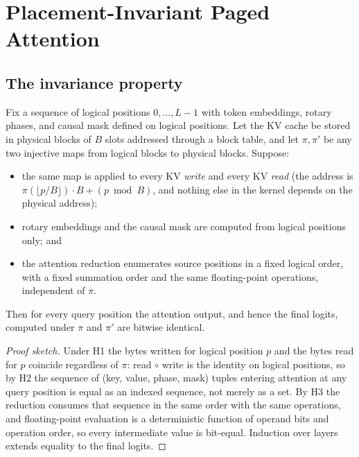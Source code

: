 \documentclass[sigconf,nonacm,screen]{acmart}
\begin{document}
\section{Placement-Invariant Paged Attention}
\label{sec:vpa}

\subsection{The invariance property}
\label{sec:vpa-prop}

\begin{proposition}
\label{prop:invariance}
Fix a sequence of logical positions $0,\dots,L-1$ with token embeddings,
rotary phases, and causal mask defined on logical positions. Let the KV cache
be stored in physical blocks of $B$ slots addressed through a block table,
and let $\pi,\pi'$ be any two injective maps from logical blocks to physical
blocks. Suppose:
\begin{itemize}\itemsep1pt
  \item[\textbf{H1}] the same map is applied to every KV \emph{write} and
  every KV \emph{read} (the address is
  $\pi(\lfloor p/B\rfloor)\cdot B + (p\bmod B)$, and nothing else in the
  kernel depends on the physical address);
  \item[\textbf{H2}] rotary embeddings and the causal mask are computed from
  logical positions only; and
  \item[\textbf{H3}] the attention reduction enumerates source positions
  in a fixed logical order, with a fixed summation order and the same
  floating-point operations, independent of $\pi$.
\end{itemize}
Then for every query position the attention output, and hence the final
logits, computed under $\pi$ and $\pi'$ are bitwise identical.
\end{proposition}

\begin{proof}[Proof sketch]
Under H1 the bytes written for logical position $p$ and the bytes read for
$p$ coincide regardless of $\pi$: read$\,\circ\,$write is the identity on
logical positions, so by H2 the sequence of (key, value, phase, mask) tuples
entering attention at any query position is equal as an indexed sequence,
not merely as a set. By H3 the reduction consumes that sequence in the same
order with the same operations, and floating-point evaluation is a
deterministic function of operand bits and operation order, so every
intermediate value is bit-equal. Induction over layers extends equality to
the final logits.
\end{proof}
\end{document}
